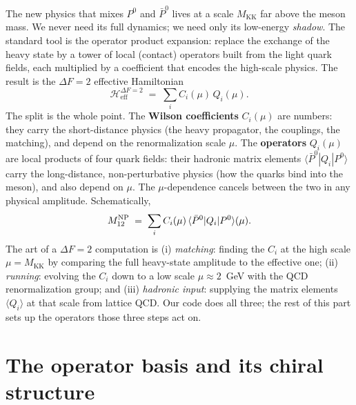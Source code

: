 \documentclass[11pt]{article}
\newcommand{\MKK}{M_{\mathrm{KK}}}
\newcommand{\Mtwelve}{M_{12}}
\newcommand{\Heff}{\mathcal{H}_{\mathrm{eff}}}
\theoremstyle{definition}
\begin{document}
The new physics that mixes $P^0$ and $\bar P^0$ lives at a scale $\MKK$ far above
the meson mass. We never need its full dynamics; we need only its low-energy
\emph{shadow}. The standard tool is the operator product expansion: replace the
exchange of the heavy state by a tower of local (contact) operators built from
the light quark fields, each multiplied by a coefficient that encodes the
high-scale physics. The result is the $\Delta F=2$ effective Hamiltonian
\begin{equation}
\boxed{\;\Heff^{\Delta F=2} \;=\; \sum_i C_i(\mu)\, Q_i(\mu).\;}
\label{eq:heff}
\end{equation}
The split is the whole point. The \textbf{Wilson coefficients} $C_i(\mu)$ are
numbers: they carry the short-distance physics (the heavy propagator, the
couplings, the matching), and depend on the renormalization scale $\mu$. The
\textbf{operators} $Q_i(\mu)$ are local products of four quark fields: their
hadronic matrix elements $\langle\bar P^0|Q_i|P^0\rangle$ carry the long-distance,
non-perturbative physics (how the quarks bind into the meson), and also depend on
$\mu$. The $\mu$-dependence cancels between the two in any physical amplitude.
Schematically,
\begin{equation}
\Mtwelve^{\rm NP} \;=\; \sum_i C_i(\mu)\,\langle\bar P^0|Q_i|P^0\rangle(\mu).
\label{eq:m12sum}
\end{equation}
The art of a $\Delta F=2$ computation is (i) \emph{matching}: finding the $C_i$ at
the high scale $\mu=\MKK$ by comparing the full heavy-state amplitude to the
effective one; (ii) \emph{running}: evolving the $C_i$ down to a low scale
$\mu\approx2$~GeV with the QCD renormalization group; and (iii) \emph{hadronic
input}: supplying the matrix elements $\langle Q_i\rangle$ at that scale from
lattice QCD. Our code does all three; the rest of this part sets up the
operators those three steps act on.

\section{The operator basis and its chiral structure}
\label{sec:basis}
\end{document}
